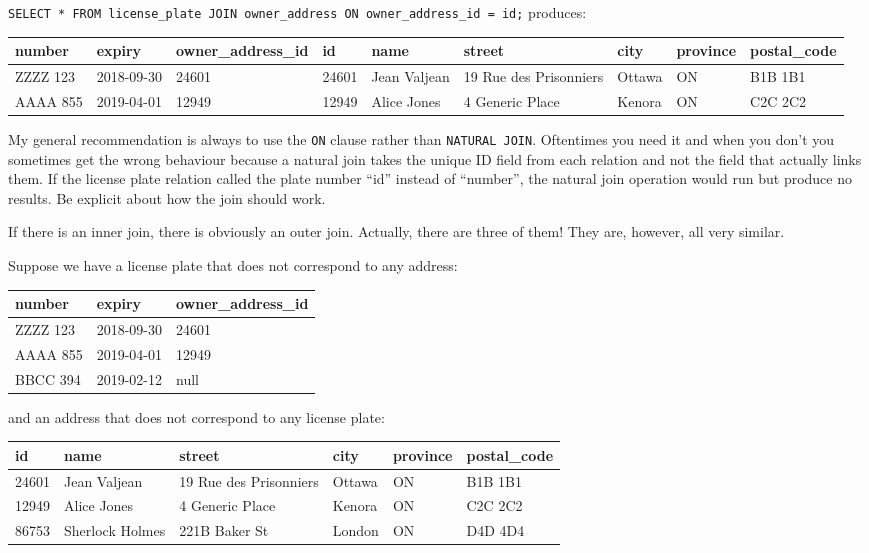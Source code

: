 \texttt{SELECT * FROM license\_plate JOIN owner\_address ON owner\_address\_id = id;} produces:

{\scriptsize
\begin{center}
	\begin{tabular}{|l|l|l|l|l|l|l|l|l|}\hline
		\textbf{number} & \textbf{expiry} & \textbf{owner\_address\_id} & \textbf{id} & \textbf{name} &\textbf{street} & \textbf{city} & \textbf{province} & \textbf{postal\_code} \\ \hline
		ZZZZ 123 & 2018-09-30 & 24601 & 24601 & Jean Valjean & 19 Rue des Prisonniers & Ottawa & ON & B1B 1B1\\ \hline
		AAAA 855 & 2019-04-01 & 12949 & 12949 & Alice Jones & 4 Generic Place & Kenora & ON & C2C 2C2\\ \hline
	\end{tabular}
\end{center}
}

My general recommendation is always to use the \texttt{ON} clause rather than \texttt{NATURAL JOIN}. Oftentimes you need it and when you don't you sometimes get the wrong behaviour because a natural join takes the unique ID field from each relation and not the field that actually links them. If the license plate relation called the plate number ``id'' instead of ``number'', the natural join operation would run but produce no results. Be explicit about how the join should work.

If there is an inner join, there is obviously an outer join. Actually, there are three of them! They are, however, all very similar.  

Suppose we have a license plate that does not correspond to any address: 

\begin{center}
\begin{tabular}{|l|l|l|}\hline
	\textbf{number} & \textbf{expiry} & \textbf{owner\_address\_id} \\ \hline
	ZZZZ 123 & 2018-09-30 & 24601 \\ \hline
	AAAA 855 & 2019-04-01 & 12949 \\ \hline
	BBCC 394 & 2019-02-12 & null \\ \hline
\end{tabular}
\end{center}

and an address that does not correspond to any license plate:

\begin{center}
	\begin{tabular}{|l|l|l|l|l|l|}\hline
		\textbf{id} & \textbf{name} &\textbf{street} & \textbf{city} & \textbf{province} & \textbf{postal\_code} \\ \hline
		24601 & Jean Valjean & 19 Rue des Prisonniers & Ottawa & ON & B1B 1B1\\ \hline
		12949 & Alice Jones & 4 Generic Place & Kenora & ON & C2C 2C2\\ \hline
		86753 & Sherlock Holmes & 221B Baker St & London & ON & D4D 4D4\\ \hline
	\end{tabular}
\end{center}


